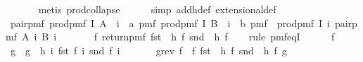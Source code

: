\begin{isabellebody}
\ \ \ \ \ \isamarkupfalse%
\ {\isacharparenleft}{\kern0pt}metis\ prod{\isachardot}{\kern0pt}collapse{\isacharparenright}{\kern0pt}\isanewline
\ \ \ \ \isamarkupfalse%
\ {\isacharparenleft}{\kern0pt}simp\ add{\isacharcolon}{\kern0pt}h{\isacharunderscore}{\kern0pt}def\ extensional{\isacharunderscore}{\kern0pt}def{\isacharparenright}{\kern0pt}\ \isanewline
\isanewline
\ \ \isamarkupfalse%
\ {\isachardoublequoteopen}pair{\isacharunderscore}{\kern0pt}pmf\ {\isacharparenleft}{\kern0pt}prod{\isacharunderscore}{\kern0pt}pmf\ I\ A\ {\isacharcolon}{\kern0pt}{\isacharcolon}{\kern0pt}\ {\isacharparenleft}{\kern0pt}{\isacharparenleft}{\kern0pt}{\isacharprime}{\kern0pt}i\ {\isasymRightarrow}\ {\isacharprime}{\kern0pt}a{\isacharparenright}{\kern0pt}\ pmf{\isacharparenright}{\kern0pt}{\isacharparenright}{\kern0pt}\ {\isacharparenleft}{\kern0pt}prod{\isacharunderscore}{\kern0pt}pmf\ I\ B\ {\isacharcolon}{\kern0pt}{\isacharcolon}{\kern0pt}\ {\isacharparenleft}{\kern0pt}{\isacharparenleft}{\kern0pt}{\isacharprime}{\kern0pt}i\ {\isasymRightarrow}\ {\isacharprime}{\kern0pt}b{\isacharparenright}{\kern0pt}\ pmf{\isacharparenright}{\kern0pt}{\isacharparenright}{\kern0pt}\ {\isacharequal}{\kern0pt}\ prod{\isacharunderscore}{\kern0pt}pmf\ I\ {\isacharparenleft}{\kern0pt}{\isasymlambda}i{\isachardot}{\kern0pt}\ pair{\isacharunderscore}{\kern0pt}pmf\ {\isacharparenleft}{\kern0pt}A\ i{\isacharparenright}{\kern0pt}\ {\isacharparenleft}{\kern0pt}B\ i{\isacharparenright}{\kern0pt}{\isacharparenright}{\kern0pt}\ {\isasymbind}\isanewline
\ \ \ \ \ \ {\isacharparenleft}{\kern0pt}{\isasymlambda}f{\isachardot}{\kern0pt}\ return{\isacharunderscore}{\kern0pt}pmf\ {\isacharparenleft}{\kern0pt}fst\ {\isasymcirc}\ h\ f{\isacharcomma}{\kern0pt}\ snd\ {\isasymcirc}\ h\ f{\isacharparenright}{\kern0pt}{\isacharparenright}{\kern0pt}{\isachardoublequoteclose}\isanewline
\ \ \isamarkupfalse%
\ {\isacharparenleft}{\kern0pt}rule\ pmf{\isacharunderscore}{\kern0pt}eqI{\isacharparenright}{\kern0pt}\isanewline
\ \ \ \ \isamarkupfalse%
\ f\isanewline
\ \ \ \ \isamarkupfalse%
\ g\ \ {\isachardoublequoteopen}g\ {\isacharequal}{\kern0pt}\ h\ {\isacharparenleft}{\kern0pt}{\isasymlambda}i{\isachardot}{\kern0pt}\ {\isacharparenleft}{\kern0pt}fst\ f\ i{\isacharcomma}{\kern0pt}\ snd\ f\ i{\isacharparenright}{\kern0pt}{\isacharparenright}{\kern0pt}{\isachardoublequoteclose}\isanewline
\ \ \ \ \isamarkupfalse%
\ \ g{\isacharunderscore}{\kern0pt}rev{\isacharcolon}{\kern0pt}\ {\isachardoublequoteopen}f\ {\isacharequal}{\kern0pt}\ {\isacharparenleft}{\kern0pt}{\isasymlambda}f{\isachardot}{\kern0pt}\ {\isacharparenleft}{\kern0pt}fst\ {\isasymcirc}\ h\ f{\isacharcomma}{\kern0pt}\ snd\ {\isasymcirc}\ h\ f{\isacharparenright}{\kern0pt}{\isacharparenright}{\kern0pt}\ g{\isachardoublequoteclose}\ \isanewline

\end{isabellebody}
